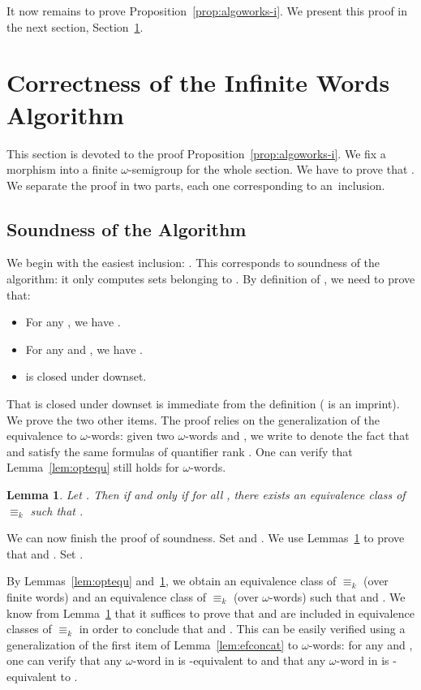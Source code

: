 \documentclass{CSML}
\newcommand\foeq[1]{\ensuremath{\equiv_{#1}}\xspace}
\newcommand\iword{\ensuremath{\omega}-word\xspace}
\newcommand\iwords{\ensuremath{\omega}-words\xspace}
\newcommand\isemi{\ensuremath{\omega}-semigroup\xspace}
\theoremstyle{plain}
\newtheorem{lemma}[thm]{Lemma}
\begin{document}
\noindent
It now remains to prove Proposition~\ref{prop:algoworks-i}. We present
this proof in the next section, Section~\ref{sec:comp-i}.

\section{Correctness of the Infinite Words Algorithm}
\label{sec:comp-i}
This section is devoted to the proof
Proposition~\ref{prop:algoworks-i}. We fix a morphism  into a finite \isemi
 for the whole section. We have to prove that
. We separate the proof
in two parts, each one corresponding to an~inclusion.

\subsection{Soundness of the Algorithm}
\label{sec:corr-algor}
We begin with the easiest inclusion: . This corresponds to soundness of the algorithm:
it only computes sets belonging to . By
definition of , we need to prove that:
\begin{itemize}
\item For any , we have .
\item For any  and , we have
  .
\item  is closed under downset.
\end{itemize}

That  is closed under downset is immediate from
the definition ( is an imprint). We prove the two
other items. The proof relies on the generalization of the equivalence
 to \iwords: given two \iwords  and , we write  to denote the fact that  and
 satisfy the same formulas of quantifier rank . One can verify
that Lemma~\ref{lem:optequ} still holds for \iwords.

\begin{lemma} \label{lem:optequi}
  Let . Then  if and only if for all , there exists
  an equivalence class  of \foeq{k} such that .
\end{lemma}

We can now finish the proof of soundness. Set 
and . We use Lemmas~\ref{lem:optequi} to
prove that  and . Set .

By Lemmas~\ref{lem:optequ} and~\ref{lem:optequi}, we obtain an
equivalence class  of \foeq{k} (over finite words)
and an equivalence class  of \foeq{k} (over
\iwords) such that  and . We know from Lemma~\ref{lem:optequi} that it suffices to
prove that  and  are included in equivalence classes of
\foeq{k} in order to conclude that  and
. This can be easily verified using a
generalization of the first item of Lemma~\ref{lem:efconcat} to
\iwords: for any  and , one can verify that
any \iword in  is -equivalent to  and that
any \iword in  is -equivalent to .
\end{document}
